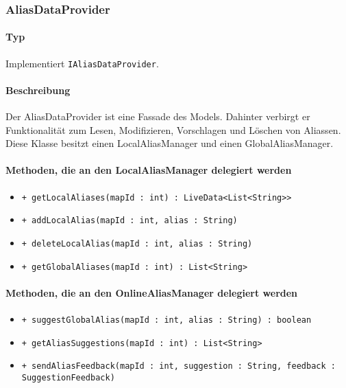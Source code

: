 \subsubsection{AliasDataProvider}\label{App_AddAlias_AliasDataProvider}
\paragraph*{Typ}
Implementiert \texttt{IAliasDataProvider}.
\paragraph*{Beschreibung}
Der AliasDataProvider ist eine Fassade des Models. 
Dahinter verbirgt er Funktionalität zum Lesen, Modifizieren, Vorschlagen und Löschen von Aliassen.\\
Diese Klasse besitzt einen LocalAliasManager und einen GlobalAliasManager.

\paragraph*{Methoden, die an den LocalAliasManager delegiert werden}
\begin{itemize}
    \item \texttt{+ getLocalAliases(mapId : int) : LiveData<List<String>>}
    \item \texttt{+ addLocalAlias(mapId : int, alias : String)}
    \item \texttt{+ deleteLocalAlias(mapId : int, alias : String)}
    \item \texttt{+ getGlobalAliases(mapId : int) : List<String>}%
\end{itemize}

\paragraph*{Methoden, die an den OnlineAliasManager delegiert werden}
\begin{itemize}
    \item \texttt{+ suggestGlobalAlias(mapId : int, alias : String) : boolean}
    \item \texttt{+ getAliasSuggestions(mapId : int) : List<String>}
    \item \texttt{+ sendAliasFeedback(mapId : int, suggestion : String, feedback : SuggestionFeedback)}
\end{itemize}
